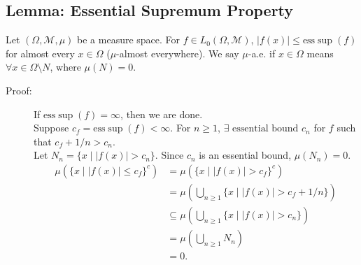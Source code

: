 \documentclass[9pt]{extarticle}
\newcommand{\esssup}{\text{ess}\sup}
\begin{document}
  \subsection{Lemma: Essential Supremum Property}%
  Let $(\Omega,\mathcal{M},\mu)$ be a measure space. For $f\in L_{0}(\Omega,\mathcal{M})$, $|f(x)| \leq \esssup(f)$ for almost every $x\in\Omega$ ($\mu$-almost everywhere). We say $\mu$-a.e. if $x\in\Omega$ means $\forall x\in\Omega \setminus N$, where $\mu(N) = 0$.
  \begin{description}
    \item[Proof:] If $\esssup(f) = \infty$, then we are done.\\

      Suppose $c_f = \esssup(f) < \infty$. For $n\geq 1$, $\exists \text{ essential bound } c_n$ for $f$ such that $c_f + 1/n > c_n$.\\

      Let $N_n = \{x\mid |f(x)| > c_n\}$. Since $c_n$ is an essential bound, $\mu(N_n) = 0$.
      \begin{align*}
        \mu\left(\{x\mid |f(x)| \leq c_f\}^{c}\right) &= \mu\left(\{x\mid |f(x)| > c_f\}^{c}\right)\\
                                                      &= \mu \left(\bigcup_{n\geq 1} \{x\mid |f(x)| > c_f + 1/n\}\right)\\
                                                      &\subseteq \mu \left(\bigcup_{n\geq 1}\{x\mid |f(x)| > c_n\}\right)\\
                                                      &= \mu \left(\bigcup_{n\geq 1}N_n\right)\\
                                                      &= 0.
      \end{align*}
  \end{description}
\end{document}
